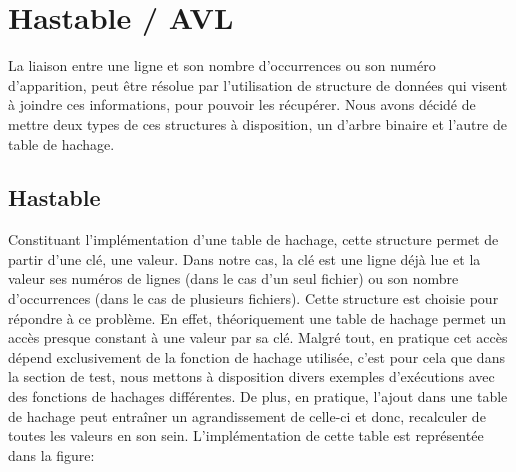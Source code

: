\documentclass[12pt]{article}
\begin{document}
    \section{Hastable / AVL}

    La liaison entre une ligne et son nombre d'occurrences ou son numéro 
    d'apparition, peut être résolue par l'utilisation de structure de données 
    qui visent à joindre ces informations, pour pouvoir les récupérer. Nous 
    avons décidé de mettre deux types de ces structures à disposition, un 
    d'arbre binaire et l'autre de table de hachage. 

    \subsection{Hastable}

    Constituant l'implémentation d'une table de hachage, cette structure permet 
    de partir d'une clé, une valeur. Dans notre cas, la clé est une ligne déjà 
    lue et la valeur ses numéros de lignes (dans le cas d'un seul fichier) ou 
    son nombre d'occurrences (dans le cas de plusieurs fichiers). Cette 
    structure est choisie pour répondre à ce problème. En effet, théoriquement 
    une table de hachage permet un accès presque constant à une valeur par sa 
    clé. Malgré tout, en pratique cet accès dépend exclusivement de la fonction 
    de hachage utilisée, c'est pour cela que dans la section de test, nous 
    mettons à disposition divers exemples d'exécutions avec des fonctions de 
    hachages différentes. De plus, en pratique, l'ajout dans une table de 
    hachage peut entraîner un agrandissement de celle-ci et donc, recalculer de 
    toutes les valeurs en son sein. L'implémentation de cette table est 
    représentée dans la figure\@: 
    
\end{document}
